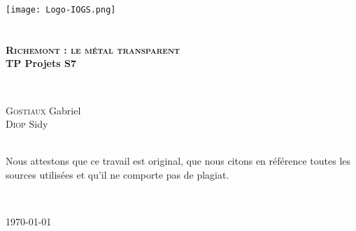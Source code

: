 \begin{titlepage}
\begin{center}

\texttt{[image: Logo-IOGS.png]}~\\[1.5cm]


\textsc{\Large }\\[0.5cm]

\HRule \\[0.4cm]

{\bfseries
\huge \textsc{Richemont : le métal transparent}\\[0.5cm]
\Large  TP Projets S7}

\HRule \\[1cm]

\begin{minipage}{0.8\textwidth}
\begin{flushleft} \large
\textsc{Gostiaux} Gabriel \\[1cm]
\textsc{Diop} Sidy \\[1cm]
\end{flushleft}
\end{minipage}


\textsc{\Large }\\[1cm]
Nous attestons que ce travail est original, que nous citons en référence toutes les sources utilisées et qu’il ne comporte pas de plagiat.

\textsc{\Large }\\[1cm]




\vfill

{\large \today}

\end{center}
\end{titlepage}